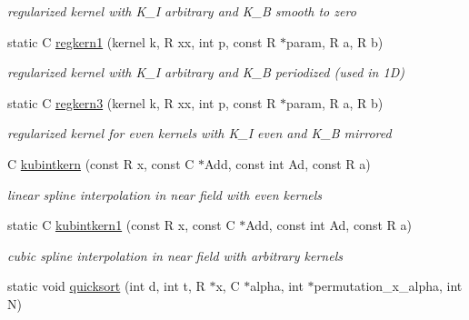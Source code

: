 \begin{DoxyCompactItemize}
\begin{DoxyCompactList}\small\item\em regularized kernel with K\-\_\-\-I arbitrary and K\-\_\-\-B smooth to zero \end{DoxyCompactList}\item 
\hypertarget{group__applications__fastsum_ga757d7cdd2cd0309f70abec04e5db12cd}{static C \hyperlink{group__applications__fastsum_ga757d7cdd2cd0309f70abec04e5db12cd}{regkern1} (kernel k, R xx, int p, const R $\ast$param, R a, R b)}\label{group__applications__fastsum_ga757d7cdd2cd0309f70abec04e5db12cd}

\begin{DoxyCompactList}\small\item\em regularized kernel with K\-\_\-\-I arbitrary and K\-\_\-\-B periodized (used in 1\-D) \end{DoxyCompactList}\item 
static C \hyperlink{group__applications__fastsum_ga9faf729384d948cc11d761c890e014c6}{regkern3} (kernel k, R xx, int p, const R $\ast$param, R a, R b)
\begin{DoxyCompactList}\small\item\em regularized kernel for even kernels with K\-\_\-\-I even and K\-\_\-\-B mirrored \end{DoxyCompactList}\item 
C \hyperlink{group__applications__fastsum_gaf2cbca475ce9688ffa19c9df96f47283}{kubintkern} (const R x, const C $\ast$Add, const int Ad, const R a)
\begin{DoxyCompactList}\small\item\em linear spline interpolation in near field with even kernels \end{DoxyCompactList}\item 
\hypertarget{group__applications__fastsum_ga5d617d4bb61ebf42a68e2ac66131d833}{static C \hyperlink{group__applications__fastsum_ga5d617d4bb61ebf42a68e2ac66131d833}{kubintkern1} (const R x, const C $\ast$Add, const int Ad, const R a)}\label{group__applications__fastsum_ga5d617d4bb61ebf42a68e2ac66131d833}

\begin{DoxyCompactList}\small\item\em cubic spline interpolation in near field with arbitrary kernels \end{DoxyCompactList}\item 
\hypertarget{group__applications__fastsum_gac5d0cf8c3771e5fef4422e1e14c00898}{static void \hyperlink{group__applications__fastsum_gac5d0cf8c3771e5fef4422e1e14c00898}{quicksort} (int d, int t, R $\ast$x, C $\ast$alpha, int $\ast$permutation\-\_\-x\-\_\-alpha, int N)}\label{group__applications__fastsum_gac5d0cf8c3771e5fef4422e1e14c00898}


\end{DoxyCompactItemize}
